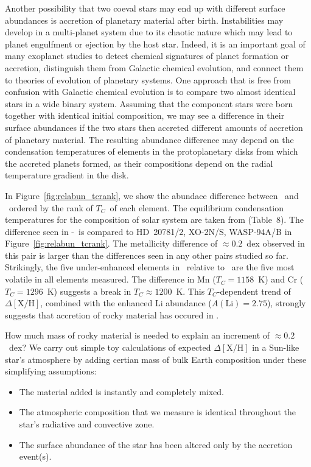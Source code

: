 \documentclass[modern, letterpaper]{aastex61}
\newcommand{\figname}{Figure}
\newcommand*\elem[1]{\ensuremath{\mathrm{#1}}}
\newcommand*\elemH[1]{\ensuremath{[\mathrm{#1}/\elem{H}]}}
\newcommand{\sunanalog}{\text{Krios}}
\newcommand{\bizarreone}{\text{Kronos}}
\newcommand{\Tcondens}{\ensuremath{T_C}}
\begin{document}
Another possibility that two coeval stars may end up with different surface
abundances is accretion of planetary material after birth.
Instabilities may develop in a multi-planet system due to its chaotic nature
which may lead to planet engulfment or ejection by the host star.
Indeed, it is an important goal of many exoplanet studies
to detect chemical signatures of planet formation or accretion,
distinguish them from Galactic chemical evolution, and
connect them to theories of evolution of planetary systems.
One approach that is free from confusion with Galactic chemical evolution
is to compare two almost identical stars in a wide binary system.
Assuming that the component stars were born together with identical
initial composition, we may see a difference in their surface abundances
if the two stars then accreted different amounts of accretion
of planetary material.
The resulting abundance difference may depend on the condensation
temperatures of elements in the protoplanetary disks from which the accreted
planets formed, as their compositions depend on the radial temperature gradient
in the disk.

In Figure~\ref{fig:relabun_tcrank}, we show the abundace difference
between \bizarreone\ and \sunanalog\ ordered by the rank of \Tcondens\
of each element.
The equilibrium condensation temperatures for the composition of solar system
are taken from \citealt{2003ApJ...591.1220L} (Table~8).
The difference seen in \bizarreone-\sunanalog\ is
compared to HD~20781/2, XO-2N/S, WASP-94A/B in \figname~\ref{fig:relabun_tcrank}.
The metallicity difference of $\approx 0.2$~dex observed in this pair
is larger than the differences seen in any other pairs studied so far.
Strikingly, the five under-enhanced elements in \bizarreone\
relative to \sunanalog\ are the five most volatile in all elements measured.
The difference in \elem{Mn} ($\Tcondens = 1158$~K) and
\elem{Cr} ($\Tcondens = 1296$~K) suggests a break in $\Tcondens \approx 1200$~K.
This $\Tcondens$-dependent trend of $\Delta\elemH{X}$,
combined with the enhanced $\elem{Li}$ abundance ($A(\elem{Li}) = 2.75$),
strongly suggests that accretion of rocky material has occured in \bizarreone.

How much mass of rocky material is needed to explain an increment of $\approx 0.2$~dex?
We carry out simple toy calculations of expected $\Delta\elemH{X}$
in a Sun-like star's atmosphere by adding certian mass of bulk Earth composition
under these simplifying assumptions:
\begin{itemize}
  \item The material added is instantly and completely mixed.
  \item The atmospheric composition that we measure is identical throughout
    the star's radiative and convective zone.
  \item The surface abundance of the star has been altered only by the
    accretion event(s).
\end{itemize}
\end{document}
